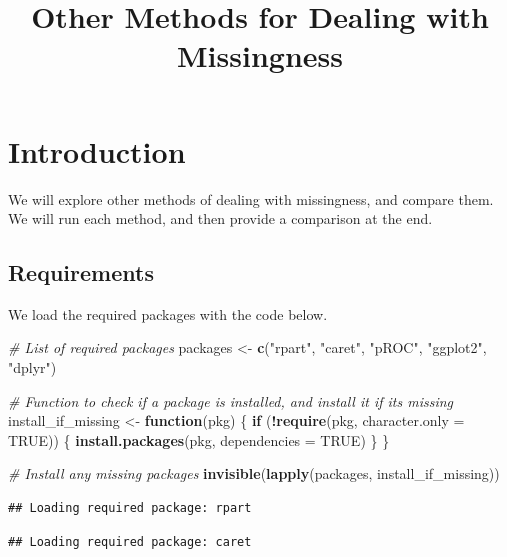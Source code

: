 \documentclass[
]{article}
\title{Other Methods for Dealing with Missingness}
\author{}
\date{\vspace{-2.5em}}
\newenvironment{Shaded}{\begin{snugshade}}{\end{snugshade}}
\newcommand{\AttributeTok}[1]{\textcolor[rgb]{0.13,0.29,0.53}{#1}}
\newcommand{\CommentTok}[1]{\textcolor[rgb]{0.56,0.35,0.01}{\textit{#1}}}
\newcommand{\ConstantTok}[1]{\textcolor[rgb]{0.56,0.35,0.01}{#1}}
\newcommand{\ControlFlowTok}[1]{\textcolor[rgb]{0.13,0.29,0.53}{\textbf{#1}}}
\newcommand{\FunctionTok}[1]{\textcolor[rgb]{0.13,0.29,0.53}{\textbf{#1}}}
\newcommand{\NormalTok}[1]{#1}
\newcommand{\OtherTok}[1]{\textcolor[rgb]{0.56,0.35,0.01}{#1}}
\newcommand{\SpecialCharTok}[1]{\textcolor[rgb]{0.81,0.36,0.00}{\textbf{#1}}}
\newcommand{\StringTok}[1]{\textcolor[rgb]{0.31,0.60,0.02}{#1}}
\begin{document}
\maketitle

{
\hypersetup{linkcolor=}
\setcounter{tocdepth}{2}
\tableofcontents
}
\section{Introduction}\label{introduction}

We will explore other methods of dealing with missingness, and compare them. We will run each method, and then provide a comparison at the end.

\subsection{Requirements}\label{requirements}

We load the required packages with the code below.

\begin{Shaded}
\begin{Highlighting}[]
\CommentTok{\# List of required packages}
\NormalTok{packages }\OtherTok{\textless{}{-}} \FunctionTok{c}\NormalTok{(}\StringTok{"rpart"}\NormalTok{, }\StringTok{"caret"}\NormalTok{, }\StringTok{"pROC"}\NormalTok{, }\StringTok{"ggplot2"}\NormalTok{, }\StringTok{"dplyr"}\NormalTok{)}

\CommentTok{\# Function to check if a package is installed, and install it if it\textquotesingle{}s missing}
\NormalTok{install\_if\_missing }\OtherTok{\textless{}{-}} \ControlFlowTok{function}\NormalTok{(pkg) \{}
  \ControlFlowTok{if}\NormalTok{ (}\SpecialCharTok{!}\FunctionTok{require}\NormalTok{(pkg, }\AttributeTok{character.only =} \ConstantTok{TRUE}\NormalTok{)) \{}
    \FunctionTok{install.packages}\NormalTok{(pkg, }\AttributeTok{dependencies =} \ConstantTok{TRUE}\NormalTok{)}
\NormalTok{  \}}
\NormalTok{\}}

\CommentTok{\# Install any missing packages}
\FunctionTok{invisible}\NormalTok{(}\FunctionTok{lapply}\NormalTok{(packages, install\_if\_missing))}
\end{Highlighting}
\end{Shaded}

\begin{verbatim}
## Loading required package: rpart
\end{verbatim}

\begin{verbatim}
## Loading required package: caret
\end{verbatim}
\end{document}

